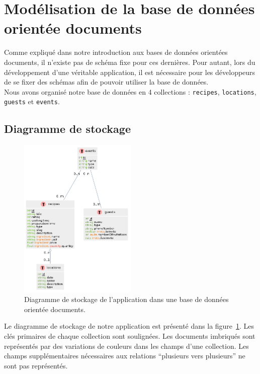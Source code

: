 \section{Modélisation de la base de données orientée documents}%
\label{sec:modelisation}

	Comme expliqué dans notre introduction aux bases de données orientées documents, il n'existe pas de schéma fixe pour ces dernières. Pour autant, lors du développement d'une véritable application, il est nécessaire pour les développeurs de se fixer des schémas afin de pouvoir utiliser la base de données.\\

	Nous avons organisé notre base de données en 4 collections : \verb|recipes|, \verb|locations|, \verb|guests| et \verb|events|.

	\subsection{Diagramme de stockage}

		\begin{figure}[H]
			\centering
			\includegraphics[width=0.5\textwidth]{images/diagramme-stockage.png}
			\caption{Diagramme de stockage de l'application dans une base de données orientée documents.}
			\label{fig:diagramme-stockage}
		\end{figure}

		Le diagramme de stockage de notre application est présenté dans la figure~\ref{fig:diagramme-stockage}. Les clés primaires de chaque collection sont soulignées. Les documents imbriqués sont représentés par des variations de couleurs dans les champs d'une collection. Les champs supplémentaires nécessaires aux relations \enquote{plusieurs vers plusieurs} ne sont pas représentés.

